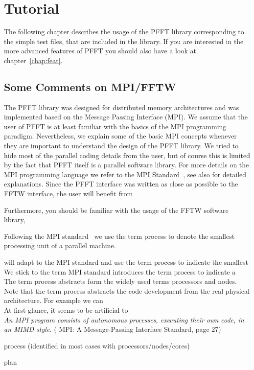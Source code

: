 \chapter{Tutorial}\label{chap:tuto}

The following chapter describes the usage of the PFFT library corresponding to the simple test files,
that are included in the library. If you are interested in the more advanced features of PFFT you
should also have a look at chapter~\ref{chap:feat}.

\section{Some Comments on MPI/FFTW}

The PFFT library was designed for distributed memory architectures and was implemented based on the Message Passing Interface (MPI).
We assume that the user of PFFT is at least familiar with the basics of the MPI programming paradigm.
Nevertheless, we explain some of the basic MPI concepts whenever they are important to understand
the design of the PFFT library. We tried to hide most of the parallel coding details from the user,
but of course this is limited by the fact that PFFT itself is a parallel software library.
For more details on the MPI programming language we refer to the MPI Standard~\cite{MPI-2.2}, see also \cite{GrLuTh99} for detailed explanations.
Since the PFFT interface was written as close as possible to the FFTW interface, the user will benefit from


Furthermore, you should be familiar with the usage of the FFTW software library,

Following the MPI standard~\cite{MPI-2.2} we use the term process to denote the smallest
processing unit of a parallel machine.

will adapt to the MPI standard and use the term process to indicate the smallest \\


We stick to the term MPI standard introduces the term process to indicate a \\
The term process abstracts form the widely used terms processors and nodes. \\
Note that the term process abstracts the code development from the real physical architecture. For example we can \\
At first glance, it seems to be artificial to \\
\emph{An MPI program consists of autonomous processes, executing their own code, in an MIMD style.}
( MPI: A Message-Passing Interface Standard, page 27)
\begin{compactitem}
  \item process (identified in most cases with processors/nodes/cores)
  \item plan
\end{compactitem}

